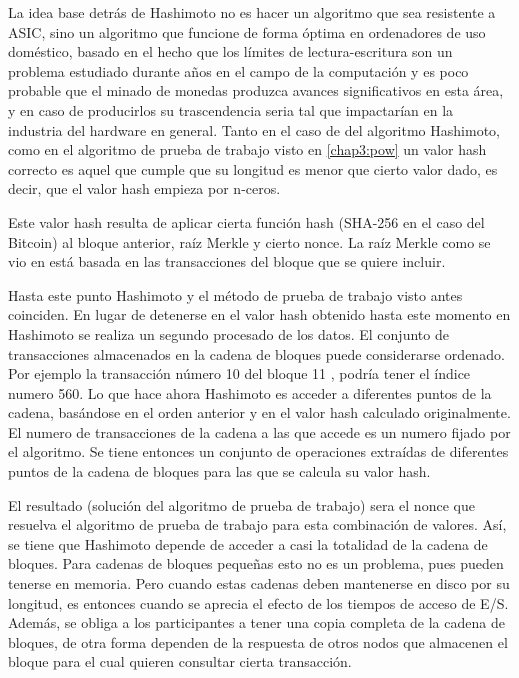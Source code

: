  La idea base detrás de Hashimoto no es hacer un algoritmo que sea resistente a ASIC, sino un algoritmo que funcione de forma óptima en ordenadores de uso doméstico, basado en el hecho que los límites de lectura-escritura son un problema estudiado durante años en el campo de la computación y es poco probable que el minado de monedas produzca avances significativos en esta área, y en caso de producirlos su trascendencia seria tal que impactarían en la industria del hardware en general.
Tanto en el caso de del algoritmo Hashimoto, como en el algoritmo de prueba de trabajo visto en \ref{chap3:pow} un valor hash correcto es aquel que cumple que su longitud es menor que cierto valor dado, es decir, que el valor hash empieza por n-ceros.

Este valor hash resulta de aplicar cierta función hash (SHA-256 en el caso del Bitcoin) al bloque anterior, raíz Merkle y cierto nonce. La raíz Merkle como se vio en \label{merkle} está basada en las transacciones del bloque que se quiere incluir. 


Hasta este punto Hashimoto y el método de prueba de trabajo visto antes coinciden. En lugar de detenerse en el valor hash obtenido hasta este momento en Hashimoto se realiza un segundo procesado de los datos. El conjunto de transacciones almacenados en la cadena de bloques puede considerarse ordenado. Por ejemplo la transacción número 10 del bloque 11 , podría tener el índice numero 560. Lo que hace ahora Hashimoto es acceder a diferentes puntos de la cadena, basándose en el orden anterior y en el valor hash calculado originalmente. El numero de transacciones de la cadena a las que accede es un numero fijado por el algoritmo. Se tiene entonces un conjunto de operaciones extraídas de diferentes puntos de la cadena de bloques para las que se calcula su valor hash.


El resultado (solución del algoritmo de prueba de trabajo) sera el nonce que resuelva el algoritmo de prueba de trabajo para esta combinación de valores. Así, se tiene que Hashimoto depende de acceder a casi la totalidad de la cadena de bloques. Para cadenas de bloques pequeñas esto no es un problema, pues pueden tenerse en memoria. Pero cuando estas cadenas deben mantenerse en disco por su longitud, es entonces cuando se aprecia el efecto de los tiempos de acceso de E/S. Además, se obliga a los participantes a tener una copia completa de la cadena de bloques, de otra forma dependen de la respuesta de otros nodos que almacenen el bloque para el cual quieren consultar cierta transacción. 

